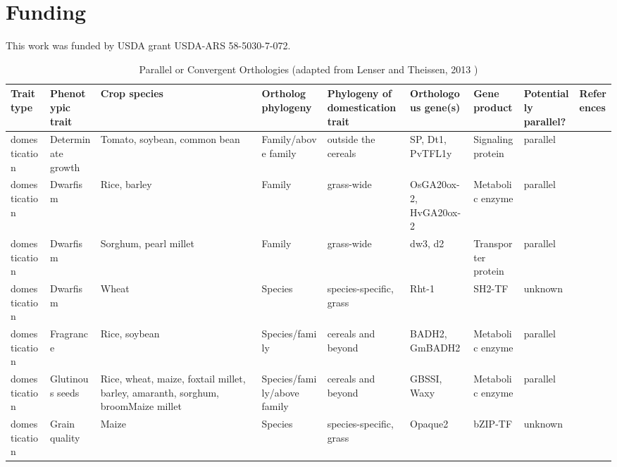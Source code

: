 \documentclass[12pt]{article}
\begin{document}
\section*{Funding}
This work was funded by USDA grant USDA-ARS 58-5030-7-072.




\begin{table}
\begin{center}
\caption{Parallel or Convergent Orthologies (adapted from Lenser and Theissen, 2013 \citep{Lenser2013})} \label{tab:Ortho}
\fontsize{7}{8}\selectfont
\begin{tabular}{C{1.5cm}G{2.5cm}C{3.10cm}C{3.2cm}C{2.3cm}G{3.5cm}G{2.1cm}C{1.3cm}G{1.5cm}}
\\\toprule
{\bf Trait type} & {\bf Phenotypic trait} &{\bf Crop species} & {\bf Ortholog phylogeny} & {\bf Phylogeny of domestication trait} & {\bf Orthologous gene(s)} & {\bf Gene product} & {\bf Potentially parallel?} & {\bf References} \\\toprule
 domestication & Determinate growth &Tomato, soybean, common bean & Family/above family & outside the cereals & SP, Dt1, PvTFL1y & Signaling protein & parallel & \citep{Doebley2006, Repinski2012, Liu2010, Kwak2012, Tian2010}\\
 domestication & Dwarfism &Rice, barley & Family & grass-wide & OsGA20ox-2, HvGA20ox-2 & Metabolic enzyme & parallel & \citep{Asano2007, Asano2011, Jia2009}\\
 domestication & Dwarfism &Sorghum, pearl millet & Family & grass-wide & dw3, d2 & Transporter protein & parallel & \citep{Multani2003,Parvathaneni2013}\\
 domestication & Dwarfism &Wheat & Species & species-specific, grass & Rht-1 & SH2-TF & unknown & \citep{Doebley2006}\\
 domestication & Fragrance &Rice, soybean & Species/family & cereals and beyond & BADH2, GmBADH2 & Metabolic enzyme & parallel & \citep{Kovach2009, Juwattanasomran2010}\\
 domestication & Glutinous seeds &Rice, wheat, maize, foxtail millet, barley, amaranth, sorghum, broomMaize millet & Species/family/above family & cereals and beyond & GBSSI, Waxy & Metabolic enzyme & parallel & \cite{Jeon2010, Fan2008, Kawahigashi2013, Kawase2005, Hunt2012, Park2011}\\
 domestication & Grain quality &Maize & Species & species-specific, grass & Opaque2 & bZIP-TF & unknown & \citep{Martin2013}\\

\end{tabular}
\end{center}
\end{table}
\end{document}
